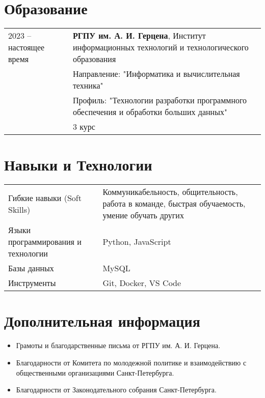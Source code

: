 \documentclass[a4paper,12pt]{article}
\begin{document}
\section{Образование}
\begin{tabularx}{\linewidth}{@{}l X@{}}	
2023 -- настоящее время & \textbf{РГПУ им. А. И. Герцена}, Институт информационных технологий и технологического образования \\ 
& Направление: "Информатика и вычислительная техника" \\
& Профиль: "Технологии разработки программного обеспечения и обработки больших данных" \\
& 3 курс \\
\end{tabularx}

\section{Навыки и Технологии}
\begin{tabularx}{\linewidth}{@{}l X@{}}
Гибкие навыки (Soft Skills) &  \normalsize{Коммуникабельность, общительность, работа в команде, быстрая обучаемость, умение обучать других}\\
Языки программирования и технологии  &  \normalsize{Python, JavaScript} \\  
Базы данных & \normalsize{MySQL} \\
Инструменты & \normalsize{Git, Docker, VS Code} \\
\end{tabularx}

\section{Дополнительная информация}
\begin{itemize}
    \item Грамоты и благодарственные письма от РГПУ им. А. И. Герцена.
    \item Благодарности от Комитета по молодежной политике и взаимодействию с общественными организациями Санкт-Петербурга.
    \item Благодарности от Законодательного собрания Санкт-Петербурга.
\end{itemize}

\vfill
{}
\end{document}
